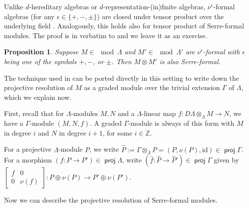 \documentclass[a4paper,reqno,11pt]{amsart}
\newtheorem{proposition}[theorem]{Proposition}
\theoremstyle{definition}
\newcommand{\Z}{\mathbb{Z}}
\DeclareMathOperator{\proj}{\mathsf{proj}}
\numberwithin{equation}{section}
\begin{document}
Unlike $d$-hereditary algebras or $d$-representation-(in)finite algebras, $\nu^\epsilon$-formal algebras (for any $\epsilon\in\{+,-,\pm\}$) are closed under tensor product over the underlying field \cite[Prop 5.4]{CIM}.  Analogously, this holds also for tensor product of Serre-formal modules.  The proof is in verbatim to \cite[Prop 5.4]{CIM} and we leave it as an exercise.
\begin{proposition}
Suppose $M\in \mod\Lambda$ and $M'\in\mod\Lambda'$ are $\nu^\epsilon$-formal with $\epsilon$ being one of the symbols $+, -$, or $\pm$.
Then $M\otimes M'$ is also Serre-formal.
\end{proposition}

The technique used in \cite{CIM} can be ported directly in this setting to write down the projective resolution of $M$ as a graded module over the trivial extension $\Gamma$ of $\Lambda$, which we explain now.

First, recall that for $\Lambda$-modules $M,N$ and a $\Lambda$-linear map $f:D\Lambda\otimes_\Lambda M\to N$, we have a $\Gamma$-module $(M, N, f)$.  A graded $\Gamma$-module is always of this form with $M$ in degree $i$ and $N$ in degree $i+1$, for some $i\in \Z$.  

For a projective $\Lambda$-module $P$, we write $\hat{P}:=\Gamma\otimes_\Lambda P = (P,\nu(P),\mathrm{id}) \in \proj \Gamma$.  For a morphism $(f:P\to P')\in \proj \Lambda$, write $(\hat{f}:\hat{P}\to\hat{P}')\in \proj \Gamma$ given by $\left[\begin{smallmatrix} f & 0 \\ 0& \nu(f)\end{smallmatrix}\right]: P\oplus \nu(P) \to P'\oplus \nu(P')$.

Now we can describe the projective resolution of Serre-formal modules.
\end{document}
